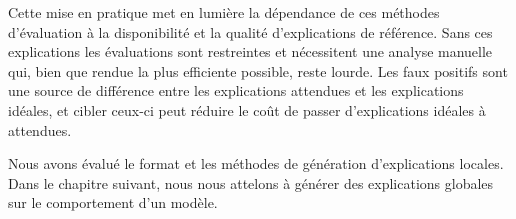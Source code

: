 Cette mise en pratique met en lumière la dépendance de ces méthodes d'évaluation à la disponibilité et la qualité d'explications de référence. Sans ces explications les évaluations sont restreintes et nécessitent une analyse manuelle qui, bien que rendue la plus efficiente possible, reste lourde.
Les faux positifs sont une source de différence entre les explications attendues et les explications idéales, et cibler ceux-ci peut réduire le coût de passer d'explications idéales à attendues.

Nous avons évalué le format et les méthodes de génération d'explications locales. Dans le chapitre suivant, nous nous attelons à générer des explications globales sur le comportement d'un modèle.

